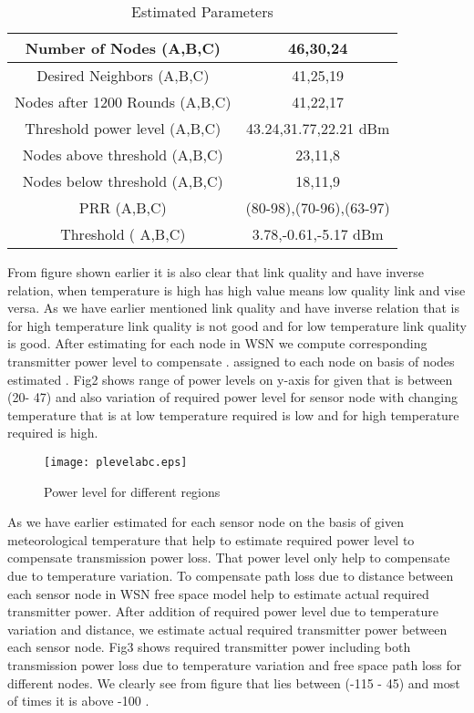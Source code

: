 \documentclass{article}
\begin{document}
\begin{table}[h!]
  \centering
  \caption{Estimated Parameters}
  \tiny
  \begin{tabular}{|c|c|}\hline
    Number of Nodes (A,B,C)   & 46,30,24 \\ \hline
    Desired Neighbors  (A,B,C)   & 41,25,19 \\ \hline
     Nodes after 1200 Rounds (A,B,C) & 41,22,17 \\ \hline
    Threshold power level (A,B,C)  & 43.24,31.77,22.21 dBm \\ \hline
    Nodes above threshold  (A,B,C)  & 23,11,8 \\ \hline
    Nodes below threshold  (A,B,C)   & 18,11,9 \\ \hline
    PRR (A,B,C) & (80-98),(70-96),(63-97)  \\ \hline
    Threshold  ( A,B,C) & 3.78,-0.61,-5.17 dBm \\\hline
    \end{tabular}\label{tab:addlabel}\end{table}
From figure shown earlier it is also clear that link quality and  have inverse relation, when temperature is high  has high value means low quality link and vise versa. As we have earlier mentioned link quality and  have inverse relation that is for high temperature link quality is not good and for low temperature link quality is good. After estimating  for each node in WSN we compute corresponding transmitter power level to compensate .  assigned to each node on basis of nodes estimated . Fig2 shows range of power levels on y-axis for given  that is between (20- 47)  and also variation of required power level for sensor node with changing temperature that is at low temperature required  is low and for high temperature required  is high.

\begin{figure}[h]
\begin{center}
\texttt{[image: plevelabc.eps]}
\vspace{-0.5cm}
\caption{ Power level  for different regions}
\end{center}
\end{figure}

As we have earlier estimated  for each sensor node on the basis of given meteorological temperature that help to estimate required power level to compensate transmission power loss. That power level only help to compensate  due to temperature variation. To compensate path loss due to distance  between each sensor node in WSN free space model help to estimate actual required transmitter power. After addition of required power level due to temperature variation and distance, we estimate actual required transmitter power between each sensor node. Fig3 shows required transmitter power including both transmission power loss due to temperature variation and free space path loss for different nodes. We clearly see from figure that  lies between (-115 - 45) and most of times it is above -100 .
\end{document}
